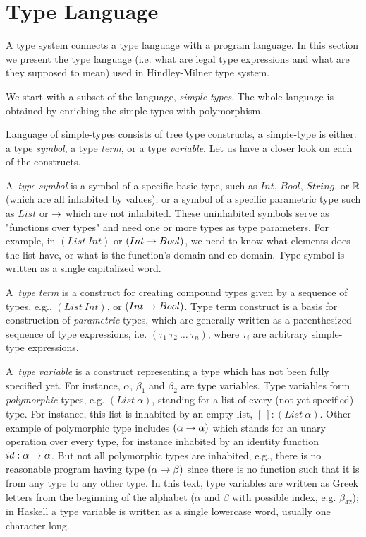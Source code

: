 \documentclass[a4paper,oneside]{memoir}
\begin{document}


\section{Type Language}
\label{sec:typelang}



A type system connects a type language with a program language.
In this section we present the type language (i.e. what are legal type expressions and what are they supposed to mean) used in Hindley-Milner type system.

We start with a subset of the language, \textit{simple-types}.
The whole language is obtained by enriching the simple-types with polymorphism.

Language of simple-types consists of tree type constructs, a simple-type is either: 
a type \textit{symbol}, 
a type \textit{term}, 
or a type \textit{variable}.
Let us have a closer look on each of the constructs.

A~\textit{type symbol} is a symbol of a specific basic type, such as 
$Int$, $Bool$, $String$, or $\mathbb{R}$ (which are all inhabited by values); 
or a symbol of a specific parametric type such as $List$ or $\rightarrow$ 
which are not inhabited. These uninhabited symbols serve as "functions over types" 
and need one or more types as type parameters. For example, in $(List~Int)$
or $(Int \rightarrow Bool)$, we need to know what elements does the list have, 
or what is the function's domain and co-domain. Type symbol is written as 
a single capitalized word.

A~\textit{type term} is a construct for creating compound types given 
by a sequence of types, e.g., $(List~Int)$, or $(Int \rightarrow Bool)$. 
Type term construct is a basis for construction of \textit{parametric} types,
which are generally written as a parenthesized sequence of type expressions, 
i.e. $(\tau_1~\tau_2~\dots~\tau_n)$, where $\tau_i$ are arbitrary 
simple-type expressions.

A~\textit{type variable} is a construct representing a type which has not been fully
specified yet. For instance, $\alpha$, $\beta_1$ and $\beta_2$ are type variables.
Type variables form \textit{polymorphic} types, 
e.g. $(List~\alpha)$, standing for a list of every (not yet specified) type. For instance,
this list is inhabited by an empty list, $[~] : (List~\alpha)$.
Other example of polymorphic type includes $(\alpha \rightarrow \alpha)$ which stands for an unary 
operation over every type, for instance inhabited by
an identity function $id : \alpha \rightarrow \alpha$. 
But not all polymorphic types are inhabited, e.g., there is no reasonable program having 
type $(\alpha \rightarrow \beta)$ since there is no function such that it is from any type to any other 
type. 
In this text, type variables are written as Greek letters from the beginning of the alphabet ($\alpha$ and $\beta$ with possible index, e.g. $\beta_{42}$); 
in Haskell a type variable is written as a single lowercase word, usually one character long.
\end{document}
